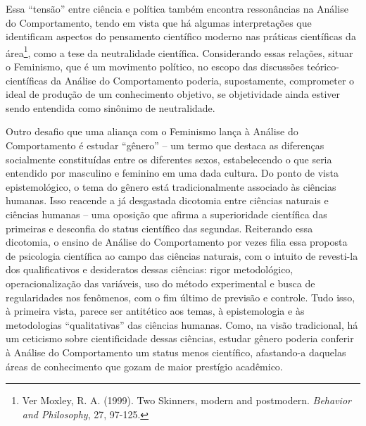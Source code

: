 Essa “tensão” entre ciência e política também encontra ressonâncias na Análise do Comportamento, tendo em vista que há algumas interpretações que identificam aspectos do pensamento científico moderno nas práticas científicas da área\footnote{Ver Moxley, R. A. (1999). Two Skinners, modern and postmodern. \emph{Behavior and Philosophy}, 27, 97-125.}, como a tese da neutralidade científica. Considerando essas relações, situar o Feminismo, que é um movimento político, no escopo das discussões teórico-científicas da Análise do Comportamento poderia, supostamente, comprometer o ideal de produção de um conhecimento objetivo, se objetividade ainda estiver sendo entendida como sinônimo de neutralidade.

Outro desafio que uma aliança com o Feminismo lança à Análise do Comportamento é estudar “gênero” – um termo que destaca as diferenças socialmente constituídas entre os diferentes sexos, estabelecendo o que seria entendido por masculino e feminino em uma dada cultura. Do ponto de vista epistemológico, o tema do gênero está tradicionalmente associado às ciências humanas. Isso reacende a já desgastada dicotomia entre ciências naturais e ciências humanas – uma oposição que afirma a superioridade científica das primeiras e desconfia do status científico das segundas. Reiterando essa dicotomia, o ensino de Análise do Comportamento por vezes filia essa proposta de psicologia científica ao campo das ciências naturais, com o intuito de revesti-la dos qualificativos e desideratos dessas ciências: rigor metodológico, operacionalização das variáveis, uso do método experimental e busca de regularidades nos fenômenos, com o fim último de previsão e controle. Tudo isso, à primeira vista, parece ser antitético aos temas, à epistemologia e às metodologias “qualitativas” das ciências humanas. Como, na visão tradicional, há um ceticismo sobre cientificidade dessas ciências, estudar gênero poderia conferir à Análise do Comportamento um status menos científico, afastando-a daquelas áreas de conhecimento que gozam de maior prestígio acadêmico. 

